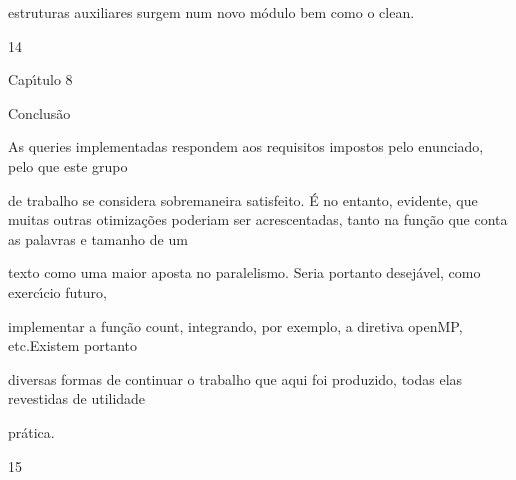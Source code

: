\documentclass[a4paper,portrait,12pt]{article}
\begin{document}
\begin{flushleft}
estruturas auxiliares surgem num novo módulo bem como o clean.
\end{flushleft}





14





\begin{flushleft}
\newpage
Cap\i{}́tulo 8
\end{flushleft}





\begin{flushleft}
Conclusão
\end{flushleft}


\begin{flushleft}
As queries implementadas respondem aos requisitos impostos pelo enunciado, pelo que este grupo
\end{flushleft}


\begin{flushleft}
de trabalho se considera sobremaneira satisfeito. É no entanto, evidente, que muitas outras otimizações poderiam ser acrescentadas, tanto na função que conta as palavras e tamanho de um
\end{flushleft}


\begin{flushleft}
texto como uma maior aposta no paralelismo. Seria portanto desejável, como exerc\i{}́cio futuro,
\end{flushleft}


\begin{flushleft}
implementar a função count, integrando, por exemplo, a diretiva openMP, etc.Existem portanto
\end{flushleft}


\begin{flushleft}
diversas formas de continuar o trabalho que aqui foi produzido, todas elas revestidas de utilidade
\end{flushleft}


\begin{flushleft}
prática.
\end{flushleft}





15





\newpage
\end{document}

